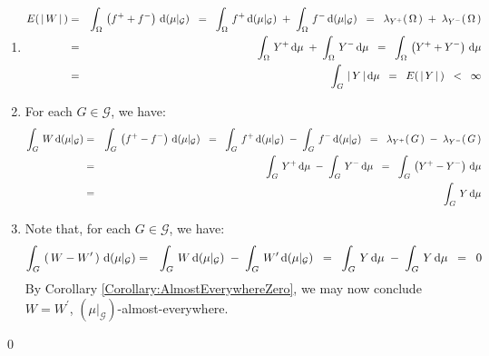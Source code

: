 \begin{enumerate}
\item\begin{eqnarray*}
	E\!\left(\,\vert\,W\,\vert\,\right)
	&=&
		\int_{\Omega}\,\left(f^{+} + f^{-}\right)\,\textnormal{d}(\mu\vert_{\mathcal{G}})
	\;\; = \;\;
		\int_{\Omega}\,f^{+} \,\textnormal{d}(\mu\vert_{\mathcal{G}}) \; + \; \int_{\Omega}\,f^{-}\,\textnormal{d}(\mu\vert_{\mathcal{G}})
	\;\; = \;\;
		\lambda_{Y^{+}}(\,\Omega\,) \; + \; \lambda_{Y^{-}}(\,\Omega\,)
	\\
	& = &
		\int_{\Omega}\,Y^{+} \,\textnormal{d}\mu \; + \; \int_{\Omega}\,Y^{-}\,\textnormal{d}\mu
	\;\; = \;\;
		\int_{\Omega}\,\left(Y^{+} + Y^{-}\right)\,\textnormal{d}\mu
	\\
	& = &
		\int_{G}\,\vert\,Y\,\vert\,\textnormal{d}\mu
	\;\; = \;\;
		E\!\left(\,\vert\,Y\,\vert\,\right)
	\;\; < \;\;
		\infty
	\end{eqnarray*}
\item
	For each $G \in \mathcal{G}$, we have:
	\begin{eqnarray*}
	\int_{G}\,W\,\textnormal{d}(\mu\vert_{\mathcal{G}})
	& = &
		\int_{G}\,\left(f^{+} - f^{-}\right)\,\textnormal{d}(\mu\vert_{\mathcal{G}})
	\;\; = \;\;
		\int_{G}\,f^{+} \,\textnormal{d}(\mu\vert_{\mathcal{G}}) \; - \; \int_{G}\,f^{-}\,\textnormal{d}(\mu\vert_{\mathcal{G}})
	\;\; = \;\;
		\lambda_{Y^{+}}(\,G\,) \; - \; \lambda_{Y^{-}}(\,G\,)
	\\
	& = &
		\int_{G}\,Y^{+} \,\textnormal{d}\mu \; - \; \int_{G}\,Y^{-}\,\textnormal{d}\mu
	\;\; = \;\;
		\int_{G}\,\left(Y^{+} - Y^{-}\right)\,\textnormal{d}\mu
	\\
	& = &
		\int_{G}\,Y\,\textnormal{d}\mu
	\end{eqnarray*}
\item
	Note that, for each $G \in \mathcal{G}$, we have:
	\begin{eqnarray*}
	\int_{G}\,\left(\,W - W^{\prime}\,\right)\,\textnormal{d}(\mu\vert_{\mathcal{G}})
	&=&
		\int_{G}\,W\,\textnormal{d}(\mu\vert_{\mathcal{G}}) \; - \; \int_{G}\,W^{\prime}\,\textnormal{d}(\mu\vert_{\mathcal{G}})
	\;\; = \;\;
		\int_{G}\,Y\,\textnormal{d}\mu \; - \; \int_{G}\,Y\,\textnormal{d}\mu
	\;\; = \;\;
		0
	\end{eqnarray*}
	By Corollary \ref{Corollary:AlmostEverywhereZero}, we may now conclude
	$W = W^{\prime}$, $(\mu\vert_{\mathcal{G}})$-almost-everywhere.
\end{enumerate}
\qed


